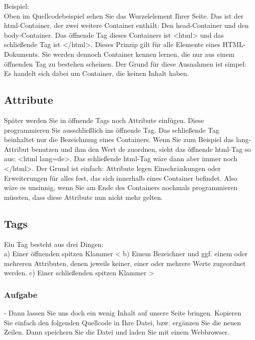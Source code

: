 Beispiel: \\

Oben im Quellcodebeispiel sehen Sie das Wurzelelement Ihrer Seite. Das ist der html-Container, der zwei weitere Container enthält: Den head-Container und den body-Container. Das öffnende Tag dieses Containers ist <html> und das schließende Tag ist </html>. Dieses Prinzip gilt für alle Elemente eines HTML-Dokuments. Sie werden dennoch Container kennen lernen, die nur aus einem öffnenden Tag zu bestehen scheinen. Der Grund für diese Ausnahmen ist simpel: Es handelt sich dabei um Container, die keinen Inhalt haben.\\

\subsection{Attribute}

Später werden Sie in öffnende Tags noch Attribute einfügen. Diese programmieren Sie ausschließlich ins öffnende Tag. Das schließende Tag beinhaltet nur die Bezeichnung eines Containers. Wenn Sie zum Beispiel das lang-Attribut benutzen und ihm den Wert de zuordnen, sieht das öffnende html-Tag so aus: <html lang=de>. Das schließende html-Tag wäre dann aber immer noch </html>. Der Grund ist einfach: Attribute legen Einschränkungen oder Erweiterungen für alles fest, das sich innerhalb eines Container befindet. Also wäre es unsinnig, wenn Sie am Ende des Containers nochmals programmieren müssten, dass diese Attribute nun nicht mehr gelten.\\

\subsection{Tags}

Ein Tag besteht aus drei Dingen:\\

a)	Einer öffnenden spitzen Klammer	<
b)	Einem Bezeichner und ggf. einem oder mehreren Attributen, denen jeweils keiner, einer oder mehrere Werte zugeordnet werden.
c)	Einer schließenden spitzen Klammer	>

\subsubsection{Aufgabe}

-	Dann lassen Sie uns doch ein wenig Inhalt auf unsere Seite bringen. Kopieren Sie einfach den folgenden Quellcode in Ihre Datei, bzw. ergänzen Sie die neuen Zeilen. Dann speichern Sie die Datei und laden Sie mit einem Webbrowser.

